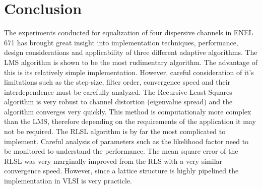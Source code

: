 \documentclass[journal]{IEEEtran}
\begin{document}
%




\section{Conclusion}
The experiments conducted for equalization of four dispersive channels in ENEL 671
has brought great insight into implementation techniques, performance, design considerations
and applicability of three different adaptive algorithms. The LMS algorithm is shown to be
the most rudimentary algorithm. The advantage of this is its relatively simple implementation. However,
careful consideration of it's limitations such as the step-size, filter order, convergence speed and their interdependence must
be carefully analyzed. The Recursive Least Squares algorithm is very robust to channel distortion (eigenvalue spread) and the
algorithm converges very quickly. This method is computationaly more complex than the LMS, therefore depending
on the requirements of the application it may not be required. The RLSL algorithm is by far the most complicated to implement.
Careful analysis of parameters such as the likelihood factor need to be monitored to understand the performance. The mean square
error of the RLSL was very marginally improved from the RLS with a very similar convergence speed. However, since a lattice
structure is highly pipelined the implementation in VLSI is very practicle.
\end{document}
